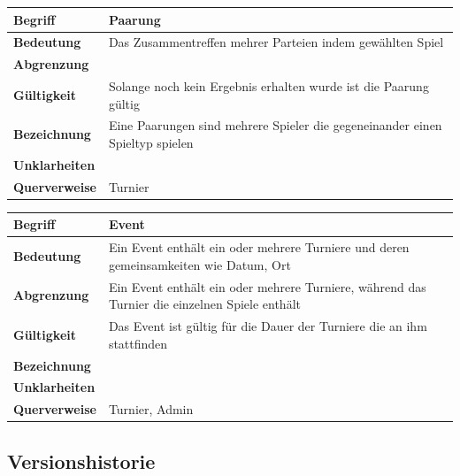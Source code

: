 \documentclass[11pt]{article}
\begin{document}
\begin{tabularx}{\textwidth}{| p{} | p{} |}
	\hline
	\textbf{Begriff} & Paarung\\
	\hline
	\textbf{Bedeutung} & Das Zusammentreffen mehrer Parteien indem gewählten Spiel\\
	\hline
	\textbf{Abgrenzung} & \\
	\hline
	\textbf{Gültigkeit} & Solange noch kein Ergebnis erhalten wurde ist die Paarung gültig\\
	\hline
	\textbf{Bezeichnung} & Eine Paarungen sind mehrere Spieler die gegeneinander einen Spieltyp spielen\\
	\hline 
	\textbf{Unklarheiten} & \\
	\hline
	\textbf{Querverweise} &  Turnier\\
	\hline
\end{tabularx}

\begin{tabularx}{\textwidth}{| p{} | p{} |}
	\hline
	\textbf{Begriff} & Event\\
	\hline
	\textbf{Bedeutung} & Ein Event enthält ein oder mehrere Turniere und deren gemeinsamkeiten wie Datum, Ort\\
	\hline
	\textbf{Abgrenzung} & Ein Event enthält ein oder mehrere Turniere, während das Turnier die einzelnen Spiele enthält\\
	\hline
	\textbf{Gültigkeit} & Das Event ist gültig für die Dauer der Turniere die an ihm stattfinden\\
	\hline
	\textbf{Bezeichnung} & \\
	\hline
	\textbf{Unklarheiten} & \\
	\hline
	\textbf{Querverweise} & Turnier, Admin\\
	\hline
\end{tabularx}

\subsection{Versionshistorie}
\end{document}
